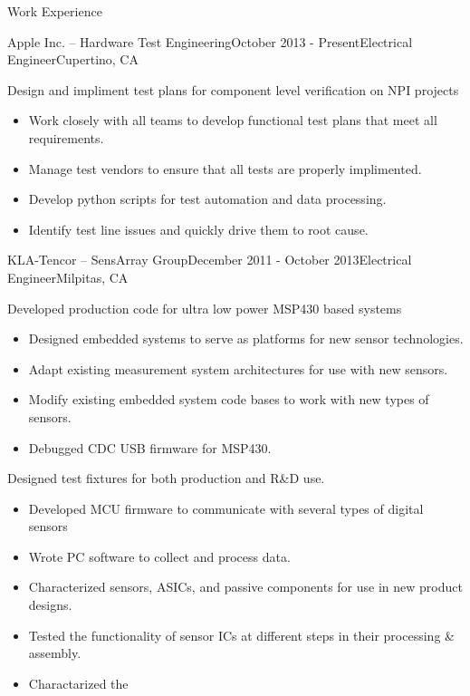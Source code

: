 \documentclass{resume} %
\begin{document}
\begin{rSection}{Work Experience}

\begin{rSubsection}{Apple Inc. -- Hardware Test Engineering}{October 2013 - Present}{Electrical Engineer}{Cupertino, CA}
\smallskip

\item Design and impliment test plans for component level verification on NPI projects
\begin{itemize}
\itemsep -0.5em \vspace{-0.5em}
\renewcommand{\labelitemi}{-}
\item Work closely with all teams to develop functional test plans that meet all requirements.
\item Manage test vendors to ensure that all tests are properly implimented.
\item Develop python scripts for test automation and data processing.
\item Identify test line issues and quickly drive them to root cause.
\end{itemize}
\medskip

\end{rSubsection}

\begin{rSubsection}{KLA-Tencor -- SensArray Group}{December 2011 - October 2013}{Electrical Engineer}{Milpitas, CA}
\smallskip

\item Developed production code for ultra low power MSP430 based systems
\begin{itemize}
\itemsep -0.5em \vspace{-0.5em}
\renewcommand{\labelitemi}{-}
\item Designed embedded systems to serve as platforms for new sensor technologies.
\item Adapt existing measurement system architectures for use with new sensors.
\item Modify existing embedded system code bases to work with new types of sensors.
\item Debugged CDC USB firmware for MSP430.
\end{itemize}
\medskip

\item Designed test fixtures for both production and R\&D use.
\begin{itemize}
\itemsep -0.5em \vspace{-0.5em}
\renewcommand{\labelitemi}{-}
\item Developed MCU firmware to communicate with several types of digital sensors
\item Wrote PC software to collect and process data.
\item Characterized sensors, ASICs, and passive components for use in new product designs.
\item Tested the functionality of sensor ICs at different steps in their processing \& assembly.
\item Charactarized the 
\end{itemize}
\medskip


\end{rSubsection}
\end{rSection}
\end{document}
